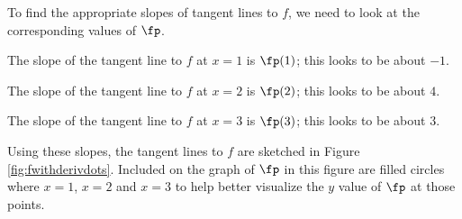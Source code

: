 {To find the appropriate slopes of tangent lines to $f$, we need to look at the corresponding values of $\fp$.

The slope of the tangent line to $f$ at $x=1$ is $\fp(1)$; this looks to be about $-1$. %

The slope of the tangent line to $f$ at $x=2$ is $\fp(2)$; this looks to be about $4$. 

The slope of the tangent line to $f$ at $x=3$ is $\fp(3)$; this looks to be about $3$. 

Using these slopes, the tangent lines to $f$ are sketched in Figure \ref{fig:fwithderivdots}. Included on the graph of $\fp$ in this figure are filled circles where $x=1$, $x=2$ and $x=3$ to help better visualize the $y$ value of $\fp$ at those points. 
}\\


